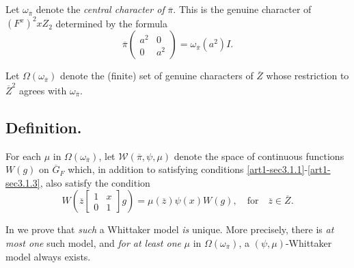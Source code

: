 \subsection{}\label{art1-sec3.3}
Let $\omega_{\overline{\pi}}$ denote the {\em central character of} $\overline{\pi}$. This is the genuine character of $(F^{x})^{2}xZ_{2}$ determined by the formula
\setcounter{equation}{0}
\begin{equation}
\overline{\pi}\left(\begin{matrix} a^{2} & 0\\ 0 & a^{2}\end{matrix}\right)=\omega_{\overline{\pi}}(a^{2})I.\label{art1-eq3.3.1}
\end{equation}

Let $\Omega(\omega_{\overline{\pi}})$ denote the (finite) set of genuine characters of $\overline{Z}$ whose restriction to $\overline{Z}^{2}$ agrees with $\omega_{\overline{\pi}}$.

\subsection{Definition.}\label{art1-sec3.4}
For each $\mu$ in $\Omega(\omega_{\overline{\pi}})$, let $\mathscr{W}(\overline{\pi},\psi,\mu)$ denote the space of continuous functions $W(g)$ on $\overline{G}_{F}$ which, in addition to satisfying conditions \eqref{art1-sec3.1.1}-\eqref{art1-sec3.1.3}, also satisfy the condition
\setcounter{equation}{0}
\begin{equation}
W\left(\overline{z}\left[\begin{smallmatrix} 1 & x\\ 0 & 1 \end{smallmatrix}\right]g\right)=\mu(\overline{z})\psi(x)W(g),\quad\text{for}\quad \overline{z}\in \overline{Z}.\label{art1-eq3.4.1}
\end{equation}

In \cite{GeHPS} we prove that {\em such} a Whittaker model {\em is} unique. More precisely, there is {\em at most one} such model, and {\em for at least one} $\mu$ in $\Omega(\omega_{\overline{\pi}})$, a $(\psi,\mu)$-Whittaker model always exists.

